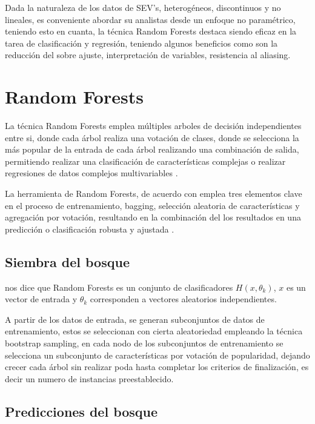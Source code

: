 	Dada la naturaleza de los datos de SEV's, heterogéneos, discontinuos y no lineales, es conveniente abordar su analistas desde un enfoque no paramétrico, teniendo esto en cuanta, la técnica Random Forests destaca siendo eficaz en la tarea de clasificación y regresión, teniendo algunos beneficios como son la reducción del sobre ajuste, interpretación de variables, resistencia al aliasing.
	
	\section{Random Forests} 
	
		La técnica Random Forests emplea múltiples arboles de decisión independientes entre si, donde cada árbol realiza una votación de clases, donde se selecciona la más popular de la entrada de cada árbol realizando una combinación de salida, permitiendo realizar una clasificación de características complejas o realizar regresiones de datos complejos multivariables \citep{breiman2001, lan2020}.
		
		La herramienta de Random Forests, de acuerdo con \citet{breiman2001} emplea tres elementos clave en el proceso de entrenamiento, bagging, selección aleatoria de características y agregación por votación, resultando en la combinación del los resultados en una predicción o clasificación robusta y ajustada \citep{lan2020}.
		
		\subsection{Siembra del bosque}
		
			\citet{breiman2001} nos dice que Random Forests es un conjunto de clasificadores $H(x,\theta_{k})$, $x$ es un vector de entrada y $\theta_{k}$ corresponden a vectores aleatorios independientes.
			
			A partir de los datos de entrada, se generan subconjuntos de datos de entrenamiento, estos se seleccionan con cierta aleatoriedad empleando la técnica bootstrap sampling, en cada nodo de los subconjuntos de entrenamiento se selecciona un subconjunto de características por votación de popularidad, dejando crecer cada árbol sin realizar poda hasta completar los criterios de finalización, es decir un numero de instancias preestablecido\citep{breiman2001}.
			
		\subsection{Predicciones del bosque}
		
